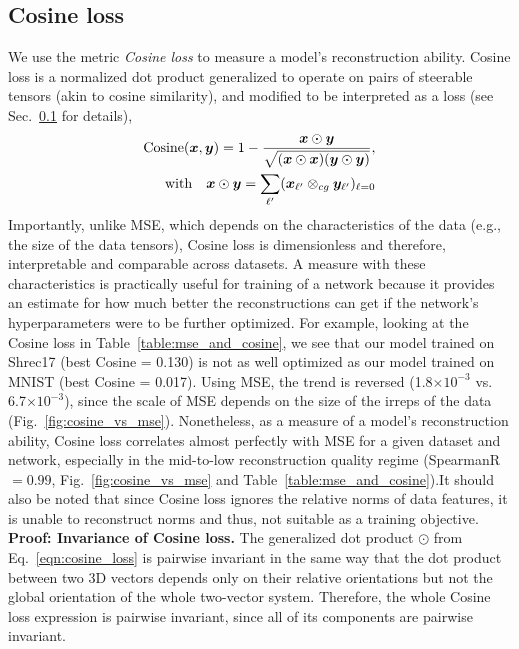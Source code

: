 \subsection{Cosine loss}
\label{sec:cosine_loss_appendix}
We use the metric {\em Cosine loss} to measure a model's reconstruction ability. Cosine loss is a
normalized dot product generalized to operate on pairs of steerable tensors (akin to cosine
similarity), and modified to be interpreted as a loss (see Sec.~\ref{sec:cosine_loss_appendix} for
details),
\begin{equation}
\begin{split}
    \text{Cosine}({\bm{x}}, {\bm{y}}) = 1 - \frac{{\bm{x}} \odot {\bm{y}}}{\sqrt{({\bm{x}} \odot {\bm{x}})({\bm{y}} \odot {\bm{y}})}}, \\
    \text{with}\quad {\bm{x}} \odot {\bm{y}} = \sum_{\ell'} ({\bm{x}}_{\ell'} \otimes_{cg} {\bm{y}}_{\ell'})_{\ell = 0}
\end{split}
    \label{eqn:cosine_loss}
\end{equation}
Importantly, unlike MSE, which depends on the characteristics of the data (e.g., the size of the
data tensors),  Cosine loss is dimensionless and therefore, interpretable and comparable across
datasets.  A measure with these characteristics is practically useful for training of a network
because it provides an estimate for how much better the reconstructions can get if the network’s
hyperparameters were to be further optimized. For example, looking at the Cosine loss in
Table~\ref{table:mse_and_cosine}, we see that our model trained on Shrec17 (best Cosine = 0.130) is
not as well optimized as our model trained on MNIST (best Cosine = 0.017). Using MSE, the trend is
reversed (1.8$\times 10^{-3}$ vs. 6.7$\times 10^{-3}$), since the scale of MSE depends on the size
of the irreps of the data (Fig.~\ref{fig:cosine_vs_mse}). Nonetheless, as a measure of a model's
reconstruction ability, Cosine loss correlates almost perfectly with MSE for a given dataset and
network, especially in the mid-to-low reconstruction quality regime (SpearmanR~$= 0.99$,
Fig.~\ref{fig:cosine_vs_mse} and Table~\ref{table:mse_and_cosine}).It should also be noted that 
since  Cosine loss ignores the relative norms of data features, it is unable to reconstruct norms
and thus, not suitable as a training objective. \\


\noindent \textbf{Proof: Invariance of  Cosine loss.}
The generalized dot product $\odot$ from Eq.~\ref{eqn:cosine_loss} is pairwise invariant in the
same way that the dot product between two 3D vectors depends only on their relative orientations
but not the global orientation of the whole two-vector system. Therefore, the whole Cosine loss
expression is pairwise invariant, since all of its components are pairwise invariant.\\


